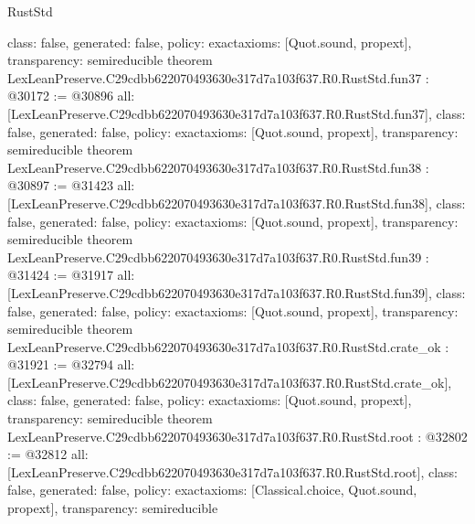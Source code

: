 \begin{lexlean}{RustStd}
\begin{coremodule}
{  class: false,
  generated: false,
  policy: exact{axioms: [Quot.sound, propext]},
  transparency: semireducible
}
theorem LexLeanPreserve.C29cdbb622070493630e317d7a103f637.R0.RustStd.fun37 : @30172 := @30896 {
  all: [LexLeanPreserve.C29cdbb622070493630e317d7a103f637.R0.RustStd.fun37],
  class: false,
  generated: false,
  policy: exact{axioms: [Quot.sound, propext]},
  transparency: semireducible
}
theorem LexLeanPreserve.C29cdbb622070493630e317d7a103f637.R0.RustStd.fun38 : @30897 := @31423 {
  all: [LexLeanPreserve.C29cdbb622070493630e317d7a103f637.R0.RustStd.fun38],
  class: false,
  generated: false,
  policy: exact{axioms: [Quot.sound, propext]},
  transparency: semireducible
}
theorem LexLeanPreserve.C29cdbb622070493630e317d7a103f637.R0.RustStd.fun39 : @31424 := @31917 {
  all: [LexLeanPreserve.C29cdbb622070493630e317d7a103f637.R0.RustStd.fun39],
  class: false,
  generated: false,
  policy: exact{axioms: [Quot.sound, propext]},
  transparency: semireducible
}
theorem LexLeanPreserve.C29cdbb622070493630e317d7a103f637.R0.RustStd.crate_ok : @31921 := @32794 {
  all: [LexLeanPreserve.C29cdbb622070493630e317d7a103f637.R0.RustStd.crate_ok],
  class: false,
  generated: false,
  policy: exact{axioms: [Quot.sound, propext]},
  transparency: semireducible
}
theorem LexLeanPreserve.C29cdbb622070493630e317d7a103f637.R0.RustStd.root : @32802 := @32812 {
  all: [LexLeanPreserve.C29cdbb622070493630e317d7a103f637.R0.RustStd.root],
  class: false,
  generated: false,
  policy: exact{axioms: [Classical.choice, Quot.sound, propext]},
  transparency: semireducible
}


\end{coremodule}
\end{lexlean}
